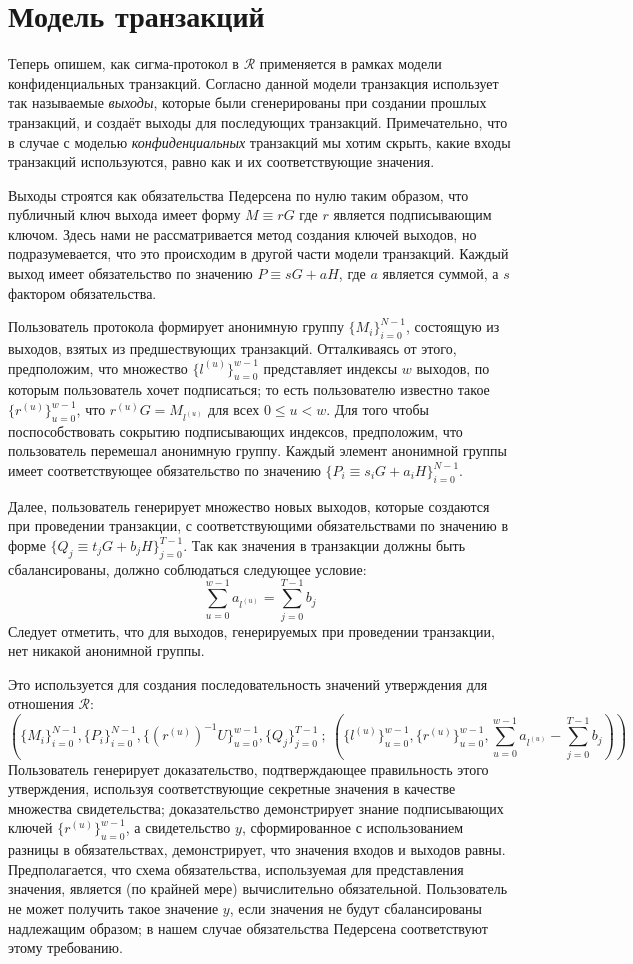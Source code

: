 \documentclass{article}
\newcommand{\sumu}{\sum_{u=0}^{w-1}}
\theoremstyle{definition}
\begin{document}
\section{Модель транзакций}
Теперь опишем, как сигма-протокол в $\mathcal{R}$ применяется в рамках модели конфиденциальных транзакций. Согласно данной модели транзакция использует так называемые \textit{выходы}, которые были сгенерированы при создании прошлых транзакций, и создаёт выходы для последующих транзакций.
Примечательно, что в случае с моделью \textit{конфиденциальных} транзакций мы хотим скрыть, какие входы транзакций используются, равно как и их соответствующие значения.

Выходы строятся как обязательства Педерсена по нулю таким образом, что публичный ключ выхода имеет форму $M \equiv rG$ где $r$ является подписывающим ключом.
Здесь нами не рассматривается метод создания ключей выходов, но подразумевается, что это происходим в другой части модели транзакций.
Каждый выход имеет обязательство по значению $P \equiv sG + aH$, где $a$ является суммой, а $s$ фактором обязательства.

Пользователь протокола формирует анонимную группу $\{M_i\}_{i=0}^{N-1}$, состоящую из выходов, взятых из предшествующих транзакций.
Отталкиваясь от этого, предположим, что множество $\{l^{(u)}\}_{u=0}^{w-1}$ представляет индексы $w$ выходов, по которым пользователь хочет подписаться; то есть пользователю известно такое $\{r^{(u)}\}_{u=0}^{w-1}$, что $r^{(u)}G = M_{l^{(u)}}$ для всех $0 \leq u < w$.
Для того чтобы поспособствовать сокрытию подписывающих индексов, предположим, что пользователь перемешал анонимную группу.
Каждый элемент анонимной группы имеет соответствующее обязательство по значению $\{P_i \equiv s_iG + a_iH\}_{i=0}^{N-1}$.

Далее, пользователь генерирует множество новых выходов, которые создаются при проведении транзакции, с соответствующими обязательствами по значению в форме $\{Q_j \equiv t_jG + b_jH\}_{j=0}^{T-1}$.
Так как значения в транзакции должны быть сбалансированы, должно соблюдаться следующее условие: $$\sum_{u=0}^{w-1} a_{l^{(u)}} = \sum_{j=0}^{T-1} b_j$$
Следует отметить, что для выходов, генерируемых при проведении транзакции, нет никакой анонимной группы.

Это используется для создания последовательность значений утверждения для отношения $\mathcal{R}$:
$$\left( \{M_i\}_{i=0}^{N-1}, \{P_i\}_{i=0}^{N-1}, \{(r^{(u)})^{-1}U\}_{u=0}^{w-1}, \{Q_j\}_{j=0}^{T-1} \: ; \: \left( \{l^{(u)}\}_{u=0}^{w-1}, \{r^{(u)}\}_{u=0}^{w-1}, \sumu a_{l^{(u)}} - \sum_{j=0}^{T-1} b_j \right) \right)$$
Пользователь генерирует доказательство, подтверждающее правильность этого утверждения, используя соответствующие секретные значения в качестве множества свидетельства; доказательство демонстрирует знание подписывающих ключей $\{r^{(u)}\}_{u=0}^{w-1}$, а свидетельство $y$, сформированное с использованием разницы в обязательствах, демонстрирует, что значения входов и выходов равны.
Предполагается, что схема обязательства, используемая для представления значения, является (по крайней мере) вычислительно обязательной. Пользователь не может получить такое значение $y$, если значения не будут сбалансированы надлежащим образом; в нашем случае обязательства Педерсена соответствуют этому требованию.
\end{document}
